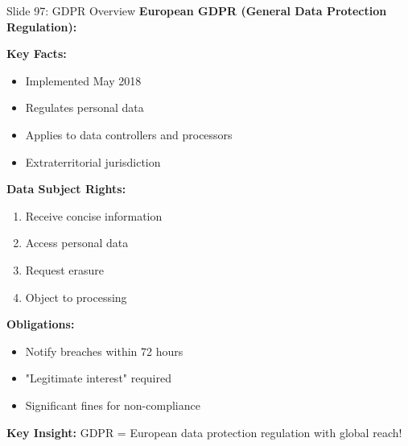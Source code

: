 \documentclass[8pt]{beamer}
\begin{document}
	\begin{frame}{Slide 97: GDPR Overview}
		\fontsize{6.5}{7.5}\selectfont
		\textbf{European GDPR (General Data Protection Regulation):}
		
		\vspace{0.1cm}
		\textbf{Key Facts:}
		\begin{itemize}
			\item Implemented May 2018
			\item Regulates personal data
			\item Applies to data controllers and processors
			\item Extraterritorial jurisdiction
		\end{itemize}
		
		\vspace{0.1cm}
		\textbf{Data Subject Rights:}
		\begin{enumerate}
			\item Receive concise information
			\item Access personal data
			\item Request erasure
			\item Object to processing
		\end{enumerate}
		
		\vspace{0.1cm}
		\textbf{Obligations:}
		\begin{itemize}
			\item Notify breaches within 72 hours
			\item "Legitimate interest" required
			\item Significant fines for non-compliance
		\end{itemize}
		
		\textcolor{myblue}{\textbf{Key Insight:}} GDPR = \textcolor{myblue}{European data protection regulation} with global reach!
	\end{frame}
	
\end{document}
